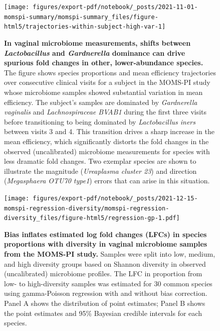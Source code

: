 \documentclass[
]{article}
\begin{document}
\begin{figure}
\texttt{[image: figures/export-pdf/notebook/\_posts/2021-11-01-momspi-summary/momspi-summary\_files/figure-html5/trajectories-within-subject-high-var-1]} \caption{\textbf{In vaginal microbiome measurements, shifts between \emph{Lactobacillus} and \emph{Gardnerella} dominance can drive spurious fold changes in other, lower-abundance species.} The figure shows species proportions and mean efficiency trajectories over consecutive clinical visits for a subject in the MOMS-PI study whose microbiome samples showed substantial variation in mean efficiency. The subject's samples are dominated by \emph{Gardnerella vaginalis} and \emph{Lachnospiraceae BVAB1} during the first three visits before transitioning to being dominated by \emph{Lactobacillus iners} between visits 3 and 4. This transition drives a sharp increase in the mean efficiency, which significantly distorts the fold changes in the observed (uncalibrated) microbiome measurements for species with less dramatic fold changes. Two exemplar species are shown to illustrate the magnitude (\emph{Ureaplasma cluster 23}) and direction (\emph{Megasphaera OTU70 type1}) errors that can arise in this situation.}\label{fig:momspi-trajectory}
\end{figure}



\begin{figure}
\centering
\texttt{[image: figures/export-pdf/notebook/\_posts/2021-12-15-momspi-regression-diversity/momspi-regression-diversity\_files/figure-html5/regression-gp-1.pdf]}
\caption{\label{fig:momspi-regression}\textbf{Bias inflates estimated log fold changes (LFCs) in species proportions with diversity in vaginal microbiome samples from the MOMS-PI study.} Samples were split into low, medium, and high diversity groups based on Shannon diversity in observed (uncalibrated) microbiome profiles. The LFC in proportion from low- to high-diversity samples was estimated for 30 common species using gamma-Poisson regression with and without bias correction. Panel A shows the distribution of point estimates; Panel B shows the point estimates and 95\% Bayesian credible intervals for each species.}
\end{figure}
\end{document}
